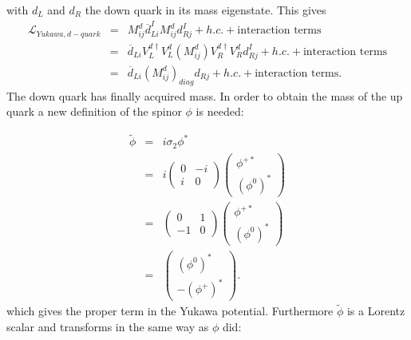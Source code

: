 with $d_L$ and $d_R$ the down quark in its mass eigenstate. This gives
\begin{eqnarray}
\mathcal{L}_{Yukawa,d-quark} &=& M^d_{ij}\overline{d}^I_{Li}M^d_{ij}d^I_{Rj} + h.c. + \mbox{interaction terms} \nonumber \\
&=& \overline{d}_{Li}V^{d\dag}_LV^d_L(M^d_{ij})V^{d\dag}_R V^d_Rd^I_{Rj} + h.c. + \mbox{interaction terms} \nonumber \\
&=& \overline{d}_{Li}(M^d_{ij})_{diag}d_{Rj} + h.c. + \mbox{interaction terms}.
\label{eqn:SMLYukawaDquarkMassEigenstates}
\end{eqnarray}
The down quark has finally acquired mass. In order to obtain the mass of the up quark a new definition of the spinor $\phi$ is needed:

\begin{eqnarray}
\tilde{\phi} &=&  i\sigma_2\phi^* \nonumber \\
&=&  i \left( \begin{array}{cc} 0 & -i \\ i & 0 \end{array} \right)  \left( \begin{array}{c} \phi^{+*} \\ (\phi^{0})^* \end{array} \right) \nonumber \\
&=&  \left( \begin{array}{cc} 0 & 1 \\ -1 & 0 \end{array} \right)  \left( \begin{array}{c} \phi^{+*} \\ (\phi^{0})^* \end{array} \right) \nonumber \\
&=&   \left( \begin{array}{c} (\phi^0)^* \\ -(\phi^+)^* \end{array} \right).
\label{eqn:SMphitilde}
\end{eqnarray}
which gives the proper term in the Yukawa potential. Furthermore $\tilde{\phi}$ is a Lorentz scalar and transforms in the same way as $\phi$ did: 

